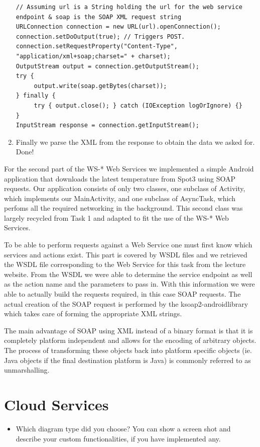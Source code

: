 \documentclass{report}
\begin{document}
\begin{enumerate}
	\begin{lstlisting}
// Assuming url is a String holding the url for the web service endpoint & soap is the SOAP XML request string
URLConnection connection = new URL(url).openConnection();
connection.setDoOutput(true); // Triggers POST.
connection.setRequestProperty("Content-Type", "application/xml+soap;charset=" + charset);
OutputStream output = connection.getOutputStream();
try {
     output.write(soap.getBytes(charset));
} finally {
     try { output.close(); } catch (IOException logOrIgnore) {}
}
InputStream response = connection.getInputStream();
	\end{lstlisting}
	\item Finally we parse the XML from the response to obtain the data we asked for. Done!
\end{enumerate}


For the second part of the WS\hbox{-}* Web Services we implemented a simple Android application that downloads the latest temperature from Spot3 using SOAP requests. Our application consists of only two classes, one subclass of Activity, which implements our MainActivity, and one subclass of AsyncTask, which perfoms all the required networking in the background. This second class was largely recycled from Task 1 and adapted to fit the use of the WS\hbox{-}* Web Services.

To be able to perform requests against a Web Service one must first know which services and actions exist. This part is covered by WSDL files and we retrieved the WSDL file corresponding to the Web Service for this task from the lecture website. From the WSDL we were able to determine the service endpoint as well as the action name and the parameters to pass in. With this information we were able to actually build the requests required, in this case SOAP requests. The actual creation of the SOAP request is performed by the ksoap2-androidlibrary\cite{ksoap2} which takes care of forming the appropriate XML strings.

The main advantage of SOAP using XML instead of a binary format is that it is completely platform independent and allows for the encoding of arbitrary objects. The process of transforming these objects back into platform specific objects (ie. Java objects if the final destination platform is Java) is commonly referred to as unmarshalling.

\section{Cloud Services}
\begin{itemize}
	\item Which diagram type did you choose? You can show a screen shot and describe your custom functionalities, if you have implemented any.
\end{itemize}
\end{document}
